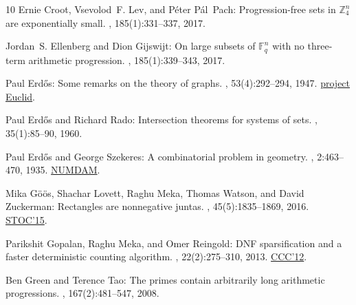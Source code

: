 \documentclass[11pt]{article}
\numberwithin{equation}{section}
\theoremstyle{definition}
\theoremstyle{plain}
\begin{document}
\begin{thebibliography}{10}
{\sc Ernie Croot, Vsevolod~F. Lev, and P\'{e}ter P\'{a}l~Pach}:
  Progression-free sets in $\mathbb{Z}_4^n$ are exponentially small.
, 185(1):331--337, 2017.

{\sc Jordan~S. Ellenberg and Dion Gijswijt}: On large subsets of
  $\mathbb{F}_q^n$ with no three-term arithmetic progression.
, 185(1):339--343, 2017.

{\sc Paul Erd\H{o}s}: Some remarks on the theory of graphs.
, 53(4):292--294, 1947.
\newblock
  \href{https://projecteuclid.org/journals/bulletin-of-the-american-mathematical-society-new-series/volume-53/issue-4/Some-remarks-on-the-theory-of-graphs/bams/1183510596.full}{project
  Euclid}.

{\sc Paul Erd\H{o}s and Richard Rado}: Intersection theorems for systems of
  sets.
, 35(1):85--90, 1960.

{\sc Paul Erd\H{o}s and George Szekeres}: A combinatorial problem in geometry.
, 2:463--470, 1935.
\newblock \href{http://www.numdam.org/item/CM\_1935\_\_2\_\_463\_0/}{NUMDAM}.

{\sc Mika G\"o\"os, Shachar Lovett, Raghu Meka, Thomas Watson, and David
  Zuckerman}: Rectangles are nonnegative juntas.
, 45(5):1835--1869, 2016.
\newblock \prelim \href{https://doi.org/10.1145/2746539.2746596}{STOC'15}.

{\sc Parikshit Gopalan, Raghu Meka, and Omer Reingold}: {DNF} sparsification
  and a faster deterministic counting algorithm.
, 22(2):275--310, 2013.
\newblock \prelim \href{https://doi.org/10.1109/CCC.2012.38}{CCC'12}.

{\sc Ben Green and Terence Tao}: The primes contain arbitrarily long arithmetic
  progressions.
, 167(2):481--547, 2008.


\end{thebibliography}
\end{document}
